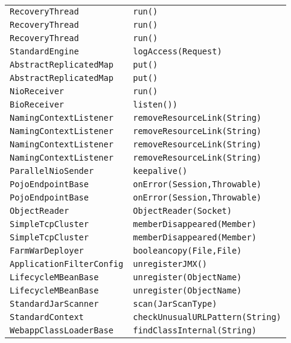 \begin{center}
\begin{longtable}{ll}
\lstinline/RecoveryThread/&{\lstinline/run()/}\\
\lstinline/RecoveryThread/&{\lstinline/run()/}\\
\lstinline/RecoveryThread/&{\lstinline/run()/}\\
\lstinline/StandardEngine/&{\lstinline/logAccess(Request)/}\\
\lstinline/AbstractReplicatedMap/&{\lstinline/put()/}\\
\lstinline/AbstractReplicatedMap/&{\lstinline/put()/}\\
\lstinline/NioReceiver/&{\lstinline/run()/}\\
\lstinline/BioReceiver/&{\lstinline/listen())/}\\
\lstinline/NamingContextListener/&{\lstinline/removeResourceLink(String)/}\\
\lstinline/NamingContextListener/&{\lstinline/removeResourceLink(String)/}\\
\lstinline/NamingContextListener/&{\lstinline/removeResourceLink(String)/}\\
\lstinline/NamingContextListener/&{\lstinline/removeResourceLink(String)/}\\
\lstinline/ParallelNioSender/&{\lstinline/keepalive()/}\\
\lstinline/PojoEndpointBase/&{\lstinline/onError(Session,Throwable)/}\\
\lstinline/PojoEndpointBase/&{\lstinline/onError(Session,Throwable)/}\\
\lstinline/ObjectReader/&{\lstinline/ObjectReader(Socket)/}\\
\lstinline/SimpleTcpCluster/&{\lstinline/memberDisappeared(Member)/}\\
\lstinline/SimpleTcpCluster/&{\lstinline/memberDisappeared(Member)/}\\
\lstinline/FarmWarDeployer/&{\lstinline/booleancopy(File,File)/}\\
\lstinline/ApplicationFilterConfig/&{\lstinline/unregisterJMX()/}\\
\lstinline/LifecycleMBeanBase/&{\lstinline/unregister(ObjectName)/}\\
\lstinline/LifecycleMBeanBase/&{\lstinline/unregister(ObjectName)/}\\
\lstinline/StandardJarScanner/&{\lstinline/scan(JarScanType)/}\\
\lstinline/StandardContext/&{\lstinline/checkUnusualURLPattern(String)/}\\
\lstinline/WebappClassLoaderBase/&{\lstinline/findClassInternal(String)/}\\

\end{longtable}
\end{center}
